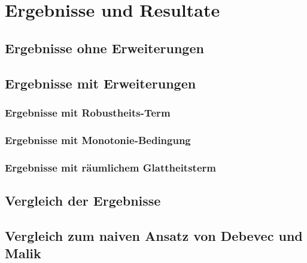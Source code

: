 \chapter{Ergebnisse und Resultate}
\label{chap:results}

\section{Ergebnisse ohne Erweiterungen}

\section{Ergebnisse mit Erweiterungen}

\subsection{Ergebnisse mit \glspl{Robustheit}-Term}
\subsection{Ergebnisse mit \gls{Monotonie}-Bedingung}
\subsection{Ergebnisse mit räumlichem Glattheitsterm}

\section{Vergleich der Ergebnisse}

\section{Vergleich zum naiven Ansatz von Debevec und Malik \cite{paper}}
